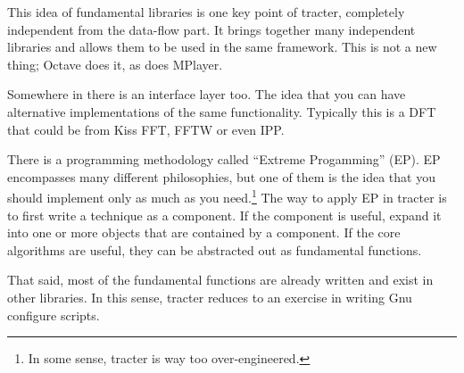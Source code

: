 This idea of fundamental libraries is one key point of tracter,
completely independent from the data-flow part.  It brings together
many independent libraries and allows them to be used in the same
framework.  This is not a new thing; Octave does it, as does MPlayer.

Somewhere in there is an interface layer too.  The idea that you can
have alternative implementations of the same functionality.  Typically
this is a DFT that could be from Kiss FFT, FFTW or even IPP.

There is a programming methodology called ``Extreme Progamming'' (EP).
EP encompasses many different philosophies, but one of them is the
idea that you should implement only as much as you need.\footnote{In
  some sense, tracter is way too over-engineered.}  The way to apply
EP in tracter is to first write a technique as a component.  If the
component is useful, expand it into one or more objects that are
contained by a component.  If the core algorithms are useful, they can
be abstracted out as fundamental functions.

That said, most of the fundamental functions are already written and
exist in other libraries.  In this sense, tracter reduces to an
exercise in writing Gnu configure scripts.


